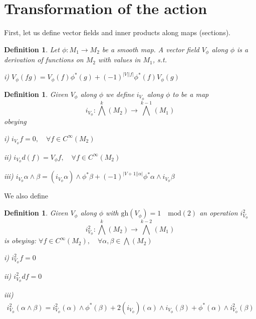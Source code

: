 \documentclass[a4paper,12pt]{article}
\numberwithin{equation}{section} %
\newtheorem{definition}[thm]{Definition}
\newcommand{\gh}[1]{\mathrm{gh}(#1)}
\begin{document}
\appendix



\section{Transformation of the action} \label{AppA}

First, let us define vector fields and inner products along maps (sections).

\begin{definition}
    Let $\phi: M_1 \rightarrow M_2$ be a smooth map. A vector field $V_\phi$ along $\phi$ is a derivation of functions on $M_2$ with values in $M_1$, s.t.

    i) $V_\phi (fg) =V_\phi (f)\phi^*(g) + (-1)^{|V||f|}\phi^*(f) V_\phi(g)$
\end{definition}

\begin{definition}
    Given $V_\phi$ along $\phi$ we define $i_{V_\phi}$ along $\phi$ to be a map 
    \begin{equation*}
        i_{V_\phi}: \bigwedge^{k}(M_2) \rightarrow \bigwedge^{k-1}(M_1) 
    \end{equation*}
    obeying

    i) $i_{V_\phi}f = 0, \quad \forall f \in C^\infty(M_2)$ 
    
    ii) $i_{V_\phi}d(f) = V_{\phi}f, \quad \forall f \in C^\infty(M_2)$ 

    iii) $i_{V_\phi} \alpha \wedge \beta = (i_{V_\phi} \alpha) \wedge \phi^*\beta + (-1)^{|V+1||\alpha|}\phi^*\alpha \wedge i_{V_\phi} \beta $
\end{definition}
We also define 
\begin{definition}
    Given $V_\phi$ along $\phi$ with $\gh{V_\phi} = 1 \quad \text{mod}(2)$ an operation $i^2_{V_\phi}$ 
    \begin{equation*}
        i^2_{V_\phi}: \bigwedge^{k}(M_2) \rightarrow \bigwedge^{k-2}(M_1) 
    \end{equation*}
is obeying: $\forall f \in C^\infty(M_2), \quad \forall \alpha, \beta \in \bigwedge (M_2)$ 

i) $i^2_{V_\phi} f = 0$

ii) $i^2_{V_\phi} df = 0$

iii)\begin{equation*}
    \begin{gathered}
        i^2_{V_\phi} (\alpha \wedge \beta) = i^2_{V_\phi} (\alpha) \wedge \phi^*(\beta)  + 2 (i_{V_\phi}) (\alpha) \wedge i_{V_\phi}(\beta)  +  \phi^*(\alpha) \wedge i^2_{V_\phi}(\beta)
    \end{gathered}
    \end{equation*} 
\end{definition}
\end{document}
